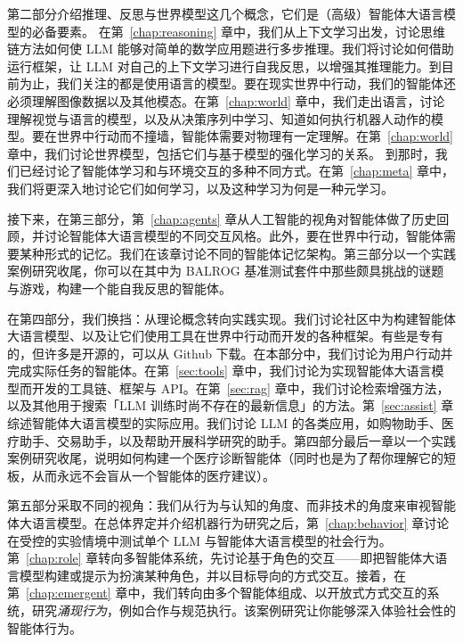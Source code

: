 第二部分介绍推理、反思与世界模型这几个概念，它们是（高级）智能体大语言模型的必备要素。%
在第~\ref{chap:reasoning} 章中，我们从上下文学习出发，讨论思维链方法如何使 LLM 能够对简单的数学应用题进行多步推理。我们将讨论如何借助运行框架，让 LLM 对自己的上下文学习进行自我反思，以增强其推理能力。到目前为止，我们关注的都是使用语言的模型。要在现实世界中行动，我们的智能体还必须理解图像数据以及其他模态。在第~\ref{chap:world} 章中，我们走出语言，讨论理解视觉与语言的模型，以及从决策序列中学习、知道如何执行机器人动作的模型。要在世界中行动而不撞墙，智能体需要对物理有一定理解。在第~\ref{chap:world} 章中，我们讨论世界模型，包括它们与基于模型的强化学习的关系。
到那时，我们已经讨论了智能体学习和与环境交互的多种不同方式。在第~\ref{chap:meta} 章中，我们将更深入地讨论它们如何学习，以及这种学习为何是一种元学习。

接下来，在第三部分，第~\ref{chap:agents} 章从人工智能的视角对智能体做了历史回顾，并讨论智能体大语言模型的不同交互风格。此外，要在世界中行动，智能体需要某种形式的记忆。我们在该章讨论不同的智能体记忆架构。第三部分以一个实践案例研究收尾，你可以在其中为 BALROG 基准测试套件中那些颇具挑战的谜题与游戏，构建一个能自我反思的智能体。

在第四部分，我们换挡：从理论概念转向实践实现。我们讨论社区中为构建智能体大语言模型、以及让它们使用工具在世界中行动而开发的各种框架。有些是专有的，但许多是开源的，可以从 Github 下载。在本部分中，我们讨论为用户行动并完成实际任务的智能体。在第~\ref{sec:tools} 章中，我们讨论为实现智能体大语言模型而开发的工具链、框架与 API。在第~\ref{sec:rag} 章中，我们讨论检索增强方法，以及其他用于搜索「LLM 训练时尚不存在的最新信息」的方法。第~\ref{sec:assist} 章综述智能体大语言模型的实际应用。我们讨论 LLM 的各类应用，如购物助手、医疗助手、交易助手，以及帮助开展科学研究的助手。第四部分最后一章以一个实践案例研究收尾，说明如何构建一个医疗诊断智能体（同时也是为了帮你理解它的短板，从而永远不会盲从一个智能体的医疗建议）。

第五部分采取不同的视角：我们从行为与认知的角度、而非技术的角度来审视智能体大语言模型。在总体界定并介绍机器行为研究之后，第~\ref{chap:behavior} 章讨论在受控的实验情境中测试单个 LLM 与智能体大语言模型的社会行为。第~\ref{chap:role} 章转向多智能体系统，先讨论基于角色的交互——即把智能体大语言模型构建或提示为扮演某种角色，并以目标导向的方式交互。接着，在第~\ref{chap:emergent} 章中，我们转向由多个智能体组成、以开放式方式交互的系统，研究{\em 涌现行为}，例如合作与规范执行。该案例研究让你能够深入体验社会性的智能体行为。


